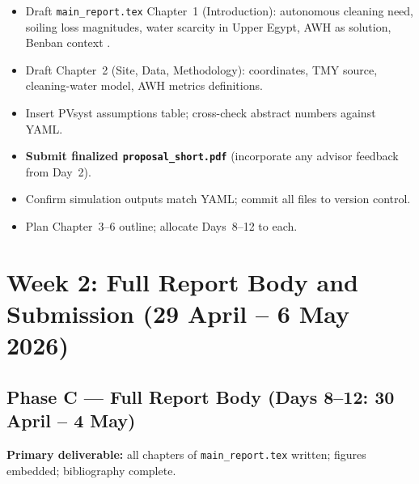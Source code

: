 \documentclass[11pt,a4paper]{article}
\begin{document}
\begin{description}[style=nextline,leftmargin=2cm,font=\normalfont\bfseries]
  \item[Day~6 \textnormal{(Tue 28 Apr)}]
  \begin{itemize}[nosep]
    \item Draft \texttt{main\_report.tex} Chapter~1 (Introduction): autonomous cleaning need, soiling loss magnitudes, water scarcity in Upper Egypt, AWH as solution, Benban context \cite{benban_irena,sarver2013pvsoiling}.
    \item Draft Chapter~2 (Site, Data, Methodology): coordinates, TMY source, cleaning-water model, AWH metrics definitions.
    \item Insert PVsyst assumptions table; cross-check abstract numbers against YAML.
  \end{itemize}

  \item[Day~7 \textnormal{(Wed 29 Apr --- Proposal Deadline)}]
  \begin{itemize}[nosep]
    \item \textbf{Submit finalized \texttt{proposal\_short.pdf}} (incorporate any advisor feedback from Day~2).
    \item Confirm simulation outputs match YAML; commit all files to version control.
    \item Plan Chapter~3--6 outline; allocate Days~8--12 to each.
  \end{itemize}
\end{description}

\section{Week 2: Full Report Body and Submission (29 April -- 6 May 2026)}

\subsection*{Phase C --- Full Report Body (Days 8--12: 30 April -- 4 May)}
\textbf{Primary deliverable:} all chapters of \texttt{main\_report.tex} written; figures embedded; bibliography complete.
\end{document}

